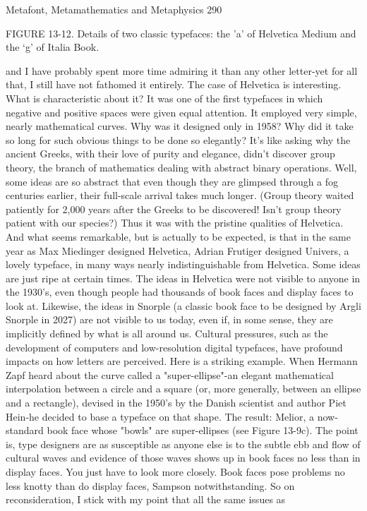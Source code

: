 Metafont, Metamathematics and Metaphysics                                                  290

FIGURE 13-12. Details of two classic typefaces: the 'a' of Helvetica Medium and the `g'
of Italia Book.

and I have probably spent more time admiring it than any other letter-yet for all that, I
still have not fathomed it entirely.
         The case of Helvetica is interesting. What is characteristic about it? It was one of
the first typefaces in which negative and positive spaces were given equal attention. It
employed very simple, nearly mathematical curves. Why was it designed only in 1958?
Why did it take so long for such obvious things to be done so elegantly? It's like asking
why the ancient Greeks, with their love of purity and elegance, didn't discover group
theory, the branch of mathematics dealing with abstract binary operations. Well, some
ideas are so abstract that even though they are glimpsed through a fog centuries earlier,
their full-scale arrival takes much longer. (Group theory waited patiently for 2,000 years
after the Greeks to be discovered! Isn't group theory patient with our species?) Thus it
was with the pristine qualities of Helvetica. And what seems remarkable, but is actually
to be expected, is that in the same year as Max Miedinger designed Helvetica, Adrian
Frutiger designed Univers, a lovely typeface, in many ways nearly indistinguishable from
Helvetica. Some ideas are just ripe at certain times.
         The ideas in Helvetica were not visible to anyone in the 1930's, even though
people had thousands of book faces and display faces to look at. Likewise, the ideas in
Snorple (a classic book face to be designed by Argli Snorple in 2027) are not visible to us
today, even if, in some sense, they are implicitly defined by what is all around us.
Cultural pressures, such as the development of computers and low-resolution digital
typefaces, have profound impacts on how letters are perceived. Here is a striking
example. When Hermann Zapf heard about the curve called a "super-ellipse"-an elegant
mathematical interpolation between a circle and a square (or, more generally, between an
ellipse and a rectangle), devised in the 1950's by the Danish scientist and author Piet
Hein-he decided to base a typeface on that shape. The result: Melior, a now-standard
book face whose "bowls" are super-ellipses (see Figure 13-9c). The point is, type
designers are as susceptible as anyone else is to the subtle ebb and flow of cultural waves
and evidence of those waves shows up in book faces no less than in display faces. You
just have to look more closely. Book faces pose problems no less knotty than do display
faces, Sampson notwithstanding.
         So on reconsideration, I stick with my point that all the same issues as




